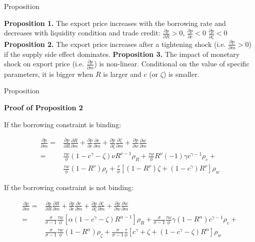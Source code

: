 \documentclass[10pt]{beamer}
\begin{document}
\begin{frame}{Proposition}

\textbf{Proposition 1.} The export price increases with the borrowing rate and decreases with liquidity condition and trade credit: $\frac{\partial p}{\partial R}>0$, $\frac{\partial p}{\partial c}<0$ $\frac{\partial p}{\partial \zeta}<0$
\vfill
\textbf{Proposition 2.} The export price increases after a tightening shock (i.e. $\frac{\partial p}{\partial m}>0$) if the supply side effect dominates.
\vfill
\textbf{Proposition 3.} The impact of monetary shock on export price (i.e. $\frac{\partial p}{\partial m}$) is non-linear. Conditional on the value of specific parameters, it is bigger when $R$ is larger and $c$ (or $\zeta$) is smaller.

\end{frame}

\begin{frame}{Proposition}

\textbf{Proof of Proposition 2}

If the borrowing constraint is binding:

\begin{align*} 
\frac{\partial p}{\partial m} =&\frac{\partial p}{\partial R}\frac{\partial R}{\partial m}+\frac{\partial p}{\partial c}\frac{\partial c}{\partial m}+\frac{\partial p}{\partial \zeta}\frac{\partial \zeta}{\partial m}+\frac{\partial p}{\partial w}\frac{\partial w}{\partial m}  \\
=& \frac{\tau w}{\phi}(1-c^\gamma-\zeta)\nu R^{\nu-1} \rho_R+ \frac{\tau w}{\phi} R^\nu(-1)\gamma c^{\gamma-1} \rho_c +\\  
& \frac{\tau w}{\phi}(1-R^\nu) \rho_t+\frac{\tau}{\phi}[(1-R^\nu)\zeta+(1-c^\gamma)R^\nu] \rho_w
\end{align*} 

If the borrowing constraint is not binding:

\begin{align*} 
\frac{\partial p}{\partial m} =&\frac{\partial p}{\partial R}\frac{\partial R}{\partial m}+\frac{\partial p}{\partial c}\frac{\partial c}{\partial m}+\frac{\partial p}{\partial \zeta}\frac{\partial \zeta}{\partial m}+\frac{\partial p}{\partial w}\frac{\partial w}{\partial m}  \\
=& \frac{\sigma}{\sigma-1}\frac{\tau w}{\phi}[\alpha(1-c^\gamma-\zeta)R^{\alpha-1}] \rho_R + \frac{\sigma}{\sigma-1}\frac{\tau w}{\phi}\gamma(1-R^\alpha)c^{\gamma-1} \rho_c + \\
& \frac{\sigma}{\sigma-1}\frac{\tau w}{\phi} (1-R^\alpha) \rho_\zeta + \frac{\sigma}{\sigma-1}\frac{\tau}{\phi}[c^\gamma+\zeta+(1-c^\gamma-\zeta)R^\alpha] \rho_w
\end{align*} 

\end{frame}
\end{document}
